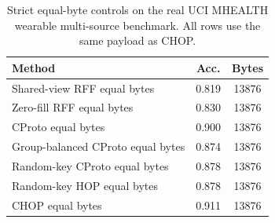 \begin{table}[t]
\centering
\caption{Strict equal-byte controls on the real UCI MHEALTH wearable multi-source benchmark. All rows use the same payload as CHOP.}
\label{tab:strict-equal-byte-mhealth}
\begin{tabular}{lcc}
\toprule
Method & Acc. & Bytes \\
\midrule
Shared-view RFF equal bytes & 0.819 & 13876 \\
Zero-fill RFF equal bytes & 0.830 & 13876 \\
CProto equal bytes & 0.900 & 13876 \\
Group-balanced CProto equal bytes & 0.874 & 13876 \\
Random-key CProto equal bytes & 0.878 & 13876 \\
Random-key HOP equal bytes & 0.878 & 13876 \\
CHOP equal bytes & 0.911 & 13876 \\
\bottomrule
\end{tabular}
\end{table}
